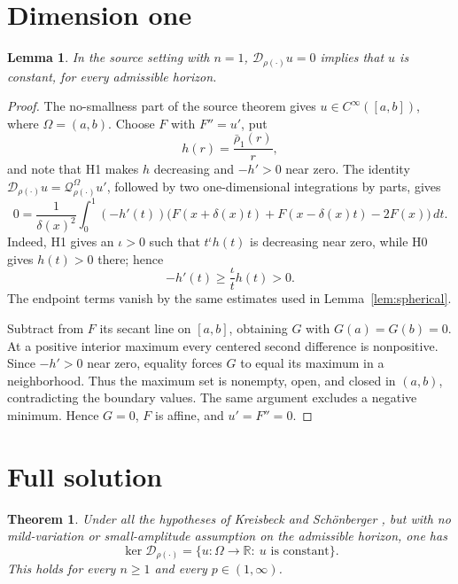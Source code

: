 \documentclass[11pt]{article}
\newtheorem{theorem}{Theorem}
\newtheorem{lemma}{Lemma}
\newcommand{\Dhet}{\mathcal D_{\rho(\cdot)}}
\newcommand{\Qhet}{\mathcal Q_{\rho(\cdot)}}
\begin{document}
\section*{Dimension one}

\begin{lemma}\label{lem:one}
In the source setting with \(n=1\), \(\Dhet u=0\) implies that \(u\) is
constant, for every admissible horizon.
\end{lemma}

\begin{proof}
The no-smallness part of the source theorem gives
\(u\in C^\infty([a,b])\), where \(\Omega=(a,b)\). Choose \(F\) with
\(F''=u'\), put
\[
 h(r)=\frac{\bar\rho_1(r)}r,
\]
and note that H1 makes \(h\) decreasing and \(-h'>0\) near zero. The identity
\(\Dhet u=\Qhet^\Omega u'\), followed by two one-dimensional integrations by
parts, gives
\[
0=\frac1{\delta(x)^2}\int_0^1(-h'(t))
\bigl(F(x+\delta(x)t)+F(x-\delta(x)t)-2F(x)\bigr)\,dt.
\]
Indeed, H1 gives an \(\iota>0\) such that \(t^\iota h(t)\) is decreasing
near zero, while H0 gives \(h(t)>0\) there; hence
\[
 -h'(t)\geq\frac{\iota}{t}h(t)>0.
\]
The endpoint terms vanish by the same estimates used in
Lemma~\ref{lem:spherical}.

Subtract from \(F\) its secant line on \([a,b]\), obtaining \(G\) with
\(G(a)=G(b)=0\). At a positive interior maximum every centered second
difference is nonpositive. Since \(-h'>0\) near zero, equality forces \(G\)
to equal its maximum in a neighborhood. Thus the maximum set is nonempty,
open, and closed in \((a,b)\), contradicting the boundary values. The same
argument excludes a negative minimum. Hence \(G=0\), \(F\) is affine, and
\(u'=F''=0\).
\end{proof}

\section*{Full solution}

\begin{theorem}\label{thm:main}
Under all the hypotheses of Kreisbeck and Schönberger
\cite[Theorem~4.17]{KS}, but with no mild-variation or small-amplitude
assumption on the admissible horizon, one has
\[
 \ker\Dhet
 =\{u:\Omega\to\mathbb R:\ u\text{ is constant}\}.
\]
This holds for every \(n\geq1\) and every \(p\in(1,\infty)\).
\end{theorem}
\end{document}
